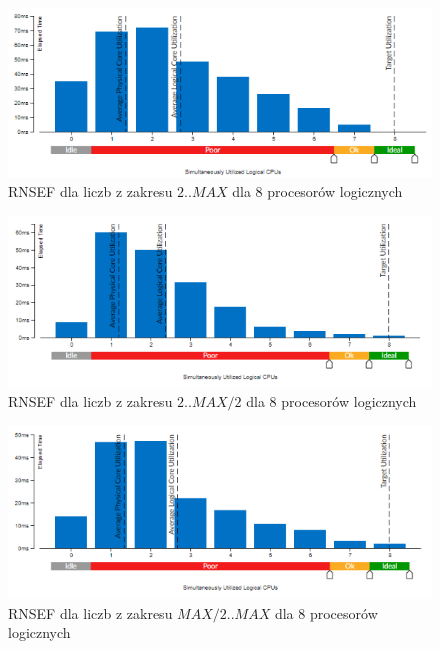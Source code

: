 \documentclass{article}
\begin{document}
                \begin{figure}[H]
                    \includegraphics[width=13cm]{rownolegly_funcion8_2_MAX}
                    \caption{\gls{RNSEF} dla liczb z zakresu $2 .. MAX$ dla 8 procesorów logicznych}
                \end{figure}
                \begin{figure}[H]
                    \includegraphics[width=13cm]{rownolegly_funcion8_2_MAX2}
                    \caption{\gls{RNSEF} dla liczb z zakresu $2 .. MAX / 2$ dla 8 procesorów logicznych}
                \end{figure}
                \begin{figure}[H]
                    \includegraphics[width=13cm]{rownolegly_funcion8_MAX2_MAX}
                    \caption{\gls{RNSEF} dla liczb z zakresu $MAX / 2 .. MAX$ dla 8 procesorów logicznych}
                \end{figure}
                
\end{document}
